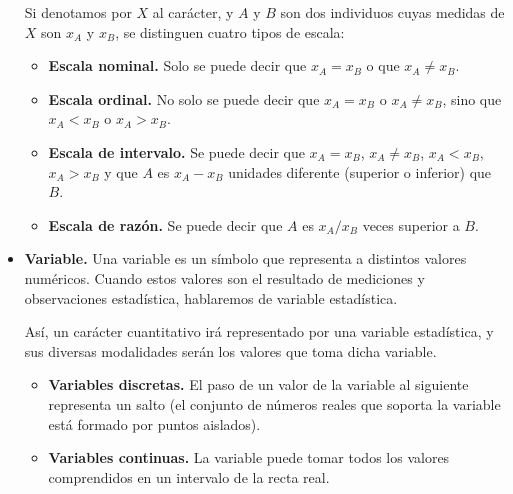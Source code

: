 \documentclass[]{article}
\begin{document}
\begin{itemize}
		Si denotamos por $X$ al carácter, y $A$ y $B$ son dos individuos cuyas medidas de $X$ son $x_A$ y $x_B$, se distinguen cuatro tipos de escala:
		\begin{itemize}
			\item \textbf{Escala nominal. }Solo se puede decir que $x_A = x_B$ o que $x_A \neq x_B$.
			\item \textbf{Escala ordinal. }No solo se puede decir que $x_A = x_B$ o $x_A \neq x_B$, sino que $x_A < x_B$ o $x_A > x_B$.
			\item \textbf{Escala de intervalo. } Se puede decir que $x_A = x_B$, $x_A \neq x_B$, $x_A < x_B$, $x_A > x_B$ y que $A$ es $x_A - x_B$ unidades diferente (superior o inferior) que $B$.
			\item \textbf{Escala de razón. }Se puede decir que $A$ es $x_A/x_B$ veces superior a $B$.
		\end{itemize}
		\item \textbf{Variable. }Una variable es un símbolo que representa a distintos valores numéricos. Cuando estos valores son el resultado de mediciones y observaciones estadística, hablaremos de variable estadística.
		
		Así, un carácter cuantitativo irá representado por una variable estadística, y sus diversas modalidades serán los valores que toma dicha variable.
		\begin{itemize}
			\item \textbf{Variables discretas. }El paso de un valor de la variable al siguiente representa un salto (el conjunto de números reales que soporta la variable está formado por puntos aislados).
			\item \textbf{Variables continuas. }La variable puede tomar todos los valores comprendidos en un intervalo de la recta real.
		\end{itemize}
	\end{itemize}

	\newpage
	
\end{document}

